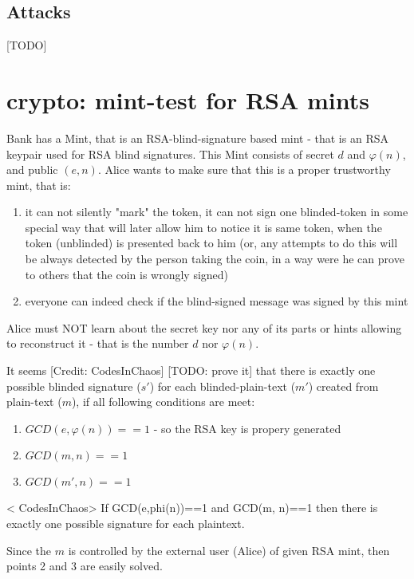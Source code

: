 \documentclass[a4paper,11pt]{article}
\begin{document}
\subsection{Attacks}

[TODO]



\section{crypto: mint-test for RSA mints}
\label{sec:crypto_mint-test}

Bank has a Mint, that is an RSA-blind-signature based mint - that is an RSA keypair used for RSA blind signatures.
This Mint consists of secret $d$ and $\varphi(n)$, and public $(e,n)$.
Alice wants to make sure that this is a proper trustworthy mint, that is:
\begin{enumerate}
  \item it can not silently "mark" the token, it can not sign one blinded-token in some special way that will later allow him to notice it is same token, when the token (unblinded) is presented back to him (or, any attempts to do this will be always detected by the person taking the coin, in a way were he can prove to others that the coin is wrongly signed)
  \item everyone can indeed check if the blind-signed message was signed by this mint
\end{enumerate}

Alice must NOT learn about the secret key nor any of its parts or hints allowing to reconstruct it - that is the number $d$ nor $\varphi(n)$.

It seems [Credit: CodesInChaos] [TODO: prove it] that there is exactly one possible blinded signature ($s'$) for each blinded-plain-text ($m'$) created from plain-text ($m$), 
if all following conditions are meet:
\begin{enumerate}
  \item $GCD(e,\varphi(n))==1$ - so the RSA key is propery generated
  \item $GCD(m, n)==1$
  \item $GCD(m',n)==1$    
\end{enumerate}

< CodesInChaos> If GCD(e,phi(n))==1 and GCD(m, n)==1 then there is exactly one possible signature for each plaintext.

Since the $m$ is controlled by the external user (Alice) of given RSA mint, then points 2 and 3 are easily solved.
\end{document}
